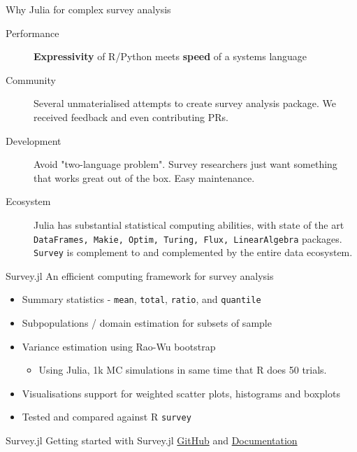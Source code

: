 \documentclass{beamer}          %
\begin{document}
\begin{frame}{Why Julia for complex survey analysis}
	\begin{description}
		\item[Performance]  \textbf{Expressivity} of R/Python meets \textbf{speed}  of a systems language
		\item[Community] Several unmaterialised attempts to create survey analysis package. We received feedback and even contributing PRs.\hyperlink{appendix_end}{} 
		\item[Development] Avoid "two-language problem". Survey researchers just want something that works great out of the box. Easy maintenance.
		\item[Ecosystem] Julia has substantial statistical computing abilities, with state of the art \texttt{DataFrames, Makie, Optim, Turing, Flux, LinearAlgebra} packages. \\ \texttt{Survey} is complement to and complemented by the entire data ecosystem.
	\end{description}			
\end{frame}

\begin{frame}{Survey.jl}  
  An efficient computing framework for survey analysis\\
  \begin{itemize}
  \item Summary statistics - \texttt{mean}, \texttt{total}, \texttt{ratio}, and \texttt{quantile}
  \item Subpopulations / domain estimation for subsets of sample
  \item Variance estimation using Rao-Wu bootstrap
  \begin{itemize}
    \item Using Julia, 1k MC simulations in same time that R does 50 trials.
  \end{itemize}
  \item Visualisations support for weighted scatter plots, histograms and boxplots
  \item Tested and compared against R \texttt{survey}
   \end{itemize}
\end{frame}

\begin{frame}{Survey.jl}
	Getting started with Survey.jl
	\href{https://github.com/xKDR/Survey.jl}{GitHub} and \href{https://xkdr.github.io/Survey.jl/dev/}{Documentation}
\end{frame}
\end{document}
